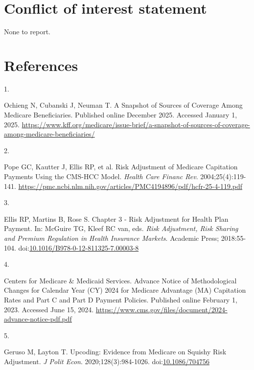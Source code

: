 \documentclass[
  12pt,
  number]{elsarticle}
\newlength{\cslhangindent}
\newlength{\csllabelwidth}
\newenvironment{CSLReferences}[2] %
 {\begin{list}{}{%
  \setlength{\itemindent}{0pt}
  \setlength{\leftmargin}{0pt}
  \setlength{\parsep}{0pt}
  \ifodd #1
   \setlength{\leftmargin}{\cslhangindent}
   \setlength{\itemindent}{-1\cslhangindent}
  \fi
  \setlength{\itemsep}{#2\baselineskip}}}
 {\end{list}}
\newcommand{\CSLLeftMargin}[1]{\parbox[t]{\csllabelwidth}{\strut#1\strut}}
\newcommand{\CSLRightInline}[1]{\parbox[t]{\linewidth - \csllabelwidth}{\strut#1\strut}}
\begin{document}
\section{Conflict of interest
statement}\label{conflict-of-interest-statement}

None to report.

\newpage{}

\section*{References}\label{references}

\label{refs}
\begin{CSLReferences}{0}{1}
\CSLLeftMargin{1. }%
\CSLRightInline{Ochieng N, Cubanski J, Neuman T. {A Snapshot of Sources
of Coverage Among Medicare Beneficiaries}. Published online December
2025. Accessed January 1, 2025.
\url{https://www.kff.org/medicare/issue-brief/a-snapshot-of-sources-of-coverage-among-medicare-beneficiaries/}}

\CSLLeftMargin{2. }%
\CSLRightInline{Pope GC, Kautter J, Ellis RP, et al. {Risk Adjustment of
Medicare Capitation Payments Using the CMS-HCC Model}. \emph{Health Care
Financ Rev}. 2004;25(4):119-141.
\url{https://pmc.ncbi.nlm.nih.gov/articles/PMC4194896/pdf/hcfr-25-4-119.pdf}}

\CSLLeftMargin{3. }%
\CSLRightInline{Ellis RP, Martins B, Rose S. {Chapter 3 - Risk
Adjustment for Health Plan Payment}. In: McGuire TG, Kleef RC van, eds.
\emph{{Risk Adjustment, Risk Sharing and Premium Regulation in Health
Insurance Markets}}. Academic Press; 2018:55-104.
doi:\href{https://doi.org/10.1016/B978-0-12-811325-7.00003-8}{10.1016/B978-0-12-811325-7.00003-8}}

\CSLLeftMargin{4. }%
\CSLRightInline{Centers for Medicare \& Medicaid Services. {Advance
Notice of Methodological Changes for Calendar Year (CY) 2024 for
Medicare Advantage (MA) Capitation Rates and Part C and Part D Payment
Policies}. Published online February 1, 2023. Accessed June 15, 2024.
\url{https://www.cms.gov/files/document/2024-advance-notice-pdf.pdf}}

\CSLLeftMargin{5. }%
\CSLRightInline{Geruso M, Layton T. {Upcoding: Evidence from Medicare on
Squishy Risk Adjustment}. \emph{{J Polit Econ}}. 2020;128(3):984-1026.
doi:\href{https://doi.org/10.1086/704756}{10.1086/704756}}


\end{CSLReferences}
\end{document}
